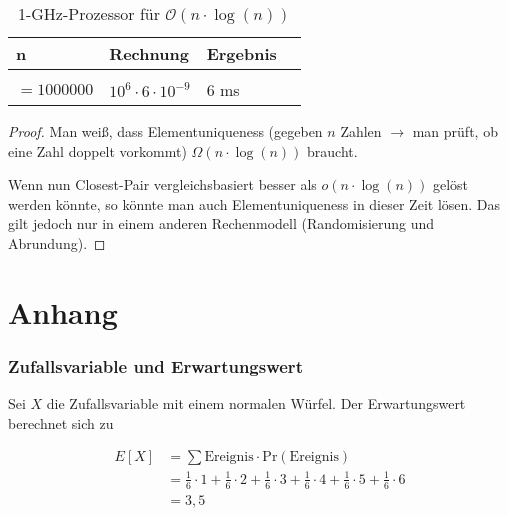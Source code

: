 \documentclass{scrartcl}%
\begin{document}
    \begin{table}[!ht]
        \centering
        \begin{tabular}{llll}
            \textbf{\textsf{n}} & \textbf{\textsf{Rechnung}} & \textbf{\textsf{Ergebnis}}\\
            \hline \\ [-2ex]
            $=1000000   $ & $10^6 \cdot 6 \cdot  10^{-9}$   & 6 ms \\
            \hline
        \end{tabular}
        \caption*{1-GHz-Prozessor für $\mathcal{O}(n \cdot \log(n))$}
    \end{table}

    \begin{proof}
        Man weiß, dass Elementuniqueness (gegeben $n$ Zahlen $\rightarrow$ man prüft, ob eine Zahl doppelt vorkommt)
        $\Omega(n \cdot \log(n))$ braucht.

        Wenn nun Closest-Pair vergleichsbasiert besser als $o(n \cdot \log(n))$ gelöst werden könnte,
        so könnte man auch Elementuniqueness in dieser Zeit lösen.
        Das gilt jedoch nur in einem anderen Rechenmodell (Randomisierung und Abrundung).
    \end{proof}

    \section*{Anhang}
    \label{sec:anhang}

    \subsubsection*{Zufallsvariable und Erwartungswert}
    \label{sec:zufallsvariableUndErwartungswert}
    Sei $X$ die Zufallsvariable  mit einem normalen Würfel.
    Der Erwartungswert berechnet sich zu

    \begin{align*}
        E[X] & = \sum \text{Ereignis} \cdot \text{Pr}(\text{Ereignis}) \\
        & = \frac{1}{6} \cdot 1 + \frac{1}{6} \cdot 2 + \frac{1}{6} \cdot 3 +
        \frac{1}{6} \cdot 4 + \frac{1}{6} \cdot 5 + \frac{1}{6} \cdot 6 \\
        & = 3,5
    \end{align*}
\end{document}
